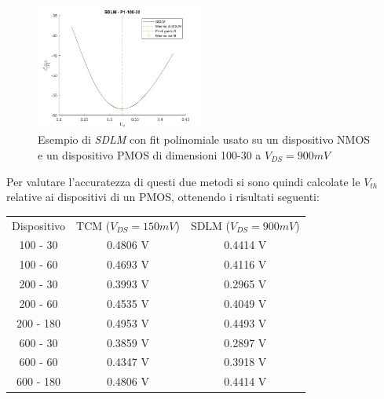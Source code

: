 \documentclass[12pt, letterpaper]{book}
\begin{document}
\begin{figure}[h!]
 \includegraphics[width=0.49\textwidth]{SDLM-P1-100-30}
 \caption{Esempio di \emph{SDLM} con fit polinomiale usato su un dispositivo NMOS e un dispositivo PMOS di dimensioni 100-30 a $V_{DS} = 900 mV$}
\end{figure}

Per valutare l'accuratezza di questi due metodi si sono quindi calcolate le $V_{th}$ relative ai dispositivi di un PMOS, ottenendo i risultati seguenti:

\begin{center}
\begin{tabular}{c c c}
Dispositivo & TCM ($V_{DS} = 150 mV$) & SDLM ($V_{DS} = 900 mV$) \\
100 - 30  & 0.4806 V & 0.4414 V \\
100 - 60  & 0.4693 V & 0.4116 V \\
200 - 30  & 0.3993 V & 0.2965 V \\
200 - 60  & 0.4535 V & 0.4049 V \\
200 - 180 & 0.4953 V & 0.4493 V \\
600 - 30 & 0.3859 V & 0.2897 V \\
600 - 60 & 0.4347 V & 0.3918 V \\
600 - 180 & 0.4806 V & 0.4414 V \\

\end{tabular}
\end{center}
\end{document}
